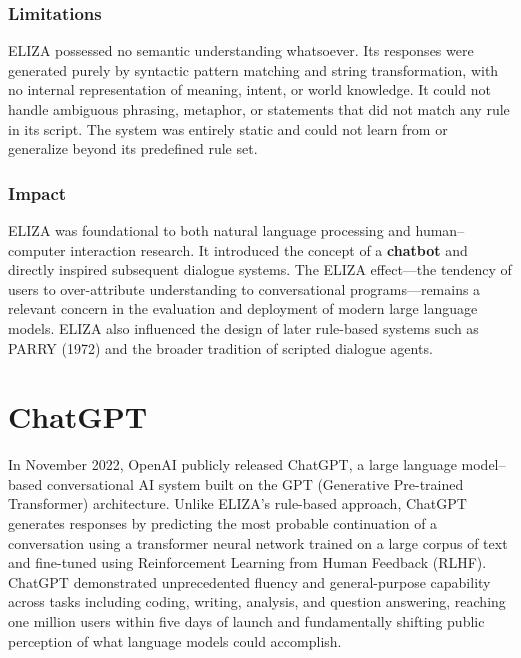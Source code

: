 \documentclass[11pt,a4paper]{report}
\begin{document}
\subsubsection{Limitations}
ELIZA possessed no semantic understanding whatsoever. Its responses were generated purely by syntactic pattern
matching and string transformation, with no internal representation of meaning, intent, or world knowledge. It
could not handle ambiguous phrasing, metaphor, or statements that did not match any rule in its script. The
system was entirely static and could not learn from or generalize beyond its predefined rule set.

\subsubsection{Impact}
ELIZA was foundational to both natural language processing and human--computer interaction research. It introduced
the concept of a \textbf{chatbot} and directly inspired subsequent dialogue systems. The ELIZA effect---the
tendency of users to over-attribute understanding to conversational programs---remains a relevant concern in the
evaluation and deployment of modern large language models. ELIZA also influenced the design of later rule-based
systems such as PARRY (1972) and the broader tradition of scripted dialogue agents.


\section{ChatGPT}
In November 2022, OpenAI publicly released ChatGPT, a large language model--based conversational AI system built
on the GPT (Generative Pre-trained Transformer) architecture. Unlike ELIZA's rule-based approach, ChatGPT
generates responses by predicting the most probable continuation of a conversation using a transformer neural
network trained on a large corpus of text and fine-tuned using Reinforcement Learning from Human Feedback (RLHF).
ChatGPT demonstrated unprecedented fluency and general-purpose capability across tasks including coding, writing,
analysis, and question answering, reaching one million users within five days of launch and fundamentally shifting
public perception of what language models could accomplish.
\end{document}
